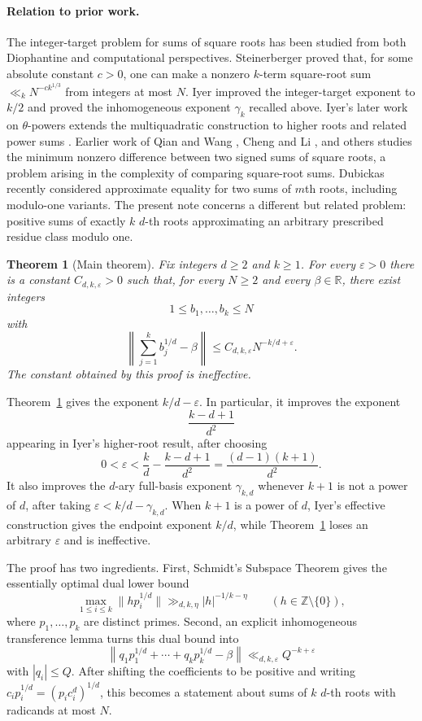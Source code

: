 \documentclass[11pt]{article}
\newtheorem{theorem}{Theorem}[section]
\theoremstyle{remark}
\newcommand{\R}{\mathbb R}
\newcommand{\Z}{\mathbb Z}
\newcommand{\eps}{\varepsilon}
\begin{document}
\paragraph{Relation to prior work.}
The integer-target problem for sums of square roots has been studied from both Diophantine and computational perspectives. Steinerberger \cite{Steinerberger2024} proved that, for some absolute constant $c>0$, one can make a nonzero $k$-term square-root sum $\ll_k N^{-c k^{1/3}}$ from integers at most $N$. Iyer \cite{Iyer2024} improved the integer-target exponent to $k/2$ and proved the inhomogeneous exponent $\gamma_k$ recalled above. Iyer's later work on $\theta$-powers extends the multiquadratic construction to higher roots and related power sums \cite{Iyer2025}. Earlier work of Qian and Wang \cite{QianWang2006}, Cheng and Li \cite{ChengLi2011}, and others studies the minimum nonzero difference between two signed sums of square roots, a problem arising in the complexity of comparing square-root sums. Dubickas \cite{Dubickas2024} recently considered approximate equality for two sums of $m$th roots, including modulo-one variants. The present note concerns a different but related problem: positive sums of exactly $k$ $d$-th roots approximating an arbitrary prescribed residue class modulo one.

\begin{theorem}[Main theorem]\label{thm:main}
Fix integers $d\geq 2$ and $k\geq 1$. For every $\eps>0$ there is a constant $C_{d,k,\eps}>0$ such that, for every $N\geq 2$ and every $\beta\in\R$, there exist integers
\[
  1\leq b_1,\ldots,b_k\leq N
\]
with
\[
  \left\|\sum_{j=1}^k b_j^{1/d}-\beta\right\|
  \leq C_{d,k,\eps} N^{-k/d+\eps}.
\]
The constant obtained by this proof is ineffective.
\end{theorem}

\smallskip
\noindent
Theorem~\ref{thm:main} gives the exponent $k/d-\eps$. In particular, it improves the exponent
\[
  \frac{k-d+1}{d^2}
\]
appearing in Iyer's higher-root result, after choosing
\[
  0<\eps<
  \frac{k}{d}-\frac{k-d+1}{d^2}
  =
  \frac{(d-1)(k+1)}{d^2}.
\]
It also improves the $d$-ary full-basis exponent $\gamma_{k,d}$ whenever $k+1$ is not a power of $d$, after taking $\eps<k/d-\gamma_{k,d}$. When $k+1$ is a power of $d$, Iyer's effective construction gives the endpoint exponent $k/d$, while Theorem~\ref{thm:main} loses an arbitrary $\eps$ and is ineffective.

\bigskip
\noindent
The proof has two ingredients. First, Schmidt's Subspace Theorem gives the essentially optimal dual lower bound
\[
  \max_{1\leq i\leq k}\|h p_i^{1/d}\|
  \gg_{d,k,\eta} |h|^{-1/k-\eta}
  \qquad(h\in\Z\setminus\{0\}),
\]
where $p_1,\ldots,p_k$ are distinct primes. Second, an explicit inhomogeneous transference lemma turns this dual bound into
\[
  \left\|q_1p_1^{1/d}+\cdots+q_kp_k^{1/d}-\beta\right\|
  \ll_{d,k,\eps} Q^{-k+\eps}
\]
with $|q_i|\leq Q$. After shifting the coefficients to be positive and writing $c_i p_i^{1/d}=(p_i c_i^d)^{1/d}$, this becomes a statement about sums of $k$ $d$-th roots with radicands at most $N$.
\end{document}
